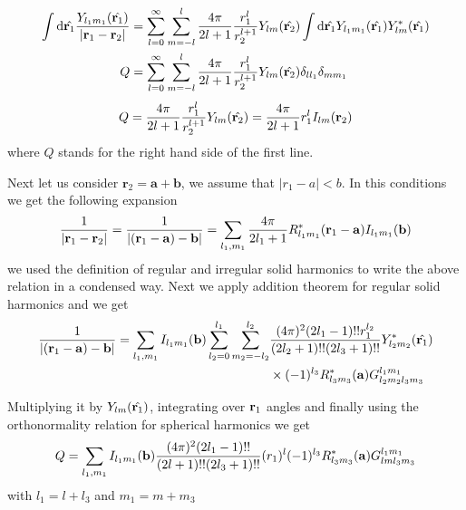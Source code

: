 \begin{equation}
\begin{split}
\int \text{d} \hat{{\bf r}_1} \frac{Y_{l_1m_1}(\hat{{\bf r}_1})}{|{\bf r}_1-{\bf
  r}_2|}&=\sum_{l=0}^{\infty}\sum_{m=-l}^{l}\frac{4
  \pi}{2l+1}\frac{r_1^l}{r_2^{l+1}}Y_{lm}(\hat{{\bf r}_2})\int \text{d} \hat{{\bf r}_1} Y_{l_1m_1}(\hat{{\bf r}_1})Y_{lm}^{*}(\hat{{\bf r}_1})\\
Q&=\sum_{l=0}^{\infty}\sum_{m=-l}^{l}\frac{4
  \pi}{2l+1}\frac{r_1^l}{r_2^{l+1}}Y_{lm}(\hat{{\bf r}_2})\delta_{ll_1}\delta_{mm_1}
\end{split}
\end{equation}
\begin{equation}
\label{q1}
Q=\frac{4
  \pi}{2l+1}\frac{r_1^l}{r_2^{l+1}}Y_{lm}(\hat{{\bf r}_2})=\frac{4
  \pi}{2l+1}r_1^lI_{lm}({\bf r}_2)
\end{equation}
where $Q$ stands for the right hand side of the first line.
\par{Next let us consider $\bm{r}_2=\bm{a}+\bm{b}$, we assume that
  $|r_1-a|<b$}. In this conditions we get the following expansion
\begin{equation}
\frac{1}{|{\bf r}_1-{\bf r}_2|}=\frac{1}{|({\bf r}_1-{\bf a})-{\bf b}|}=\sum_{l_1,m_1}\frac{4\pi}{2l_1+1}R_{l_1m_1}^{*}({\bf r}_1-{\bf a})I_{l_1m_1}({{\bf b}})
\end{equation}
we used the definition of regular and irregular solid harmonics to write the
above relation in a condensed way. Next we apply addition theorem
for regular solid harmonics and we get
\begin{equation}
\begin{split}
\frac{1}{|({\bf r}_1-{\bf a})-{\bf b}|}=\sum_{l_1,m_1}I_{l_1m_1}({{\bf b}})\sum_{l_2=0}^{l_1}\sum_{m_2=-l_2}^{l_2}&\frac{(4\pi)^2(2l_1-1)!!r_1^{l_2}}{(2l_2+1)!!(2l_3+1)!!}Y_{l_2m_2}^{*}(\hat{{\bf r}_1})\\&\times (-1)^{l_3}R_{l_3m_3}^{*}({\bf a})G_{l_2m_2l_3m_3}^{l_1m_1}
\end{split}
\end{equation}
\par{Multiplying it by $Y_{lm}(\hat{{\bf r}_1})$, integrating over ${\bf r}_1$
angles and finally using the orthonormality relation for spherical harmonics
we get}
\begin{equation}
\label{q2}
Q=\sum_{l_1,m_1}I_{l_1m_1}({{\bf b}})\frac{(4\pi)^2(2l_1-1)!!}{(2l+1)!!(2l_3+1)!!}(r_1)^{l}(-1)^{l_3}R_{l_3m_3}^{*}({\bf a})G_{lml_3m_3}^{l_1m_1}
\end{equation}
with $l_1=l+l_3$ and $m_1=m+m_3$
